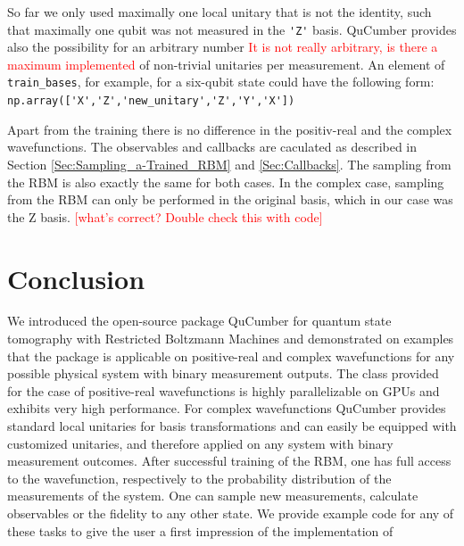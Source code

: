 \documentclass[submission, Phys]{SciPost}
\begin{document}
So far we only used maximally one local unitary that is not the identity, such that maximally one qubit was not measured in the \verb|'Z'| basis.
QuCumber provides also the possibility for an arbitrary number \textcolor{red}{It is not really arbitrary, is there a maximum implemented} of non-trivial unitaries per measurement.
An element of \verb|train_bases|, for example, for a six-qubit state could have the following form:
\verb|np.array(['X','Z','new_unitary','Z','Y','X'])|

Apart from the training there is no difference in the positiv-real and the complex wavefunctions. The observables and callbacks are caculated as described in Section \ref{Sec:Sampling_a-Trained_RBM} and \ref{Sec:Callbacks}.
The sampling from the RBM is also exactly the same for both cases.
In the complex case, sampling from the RBM can only be performed in the original basis, which in our case was the Z basis.
\textcolor{red}{[what's correct? Double check this with code]}
%

\section{Conclusion}

We introduced the open-source package QuCumber for quantum state tomography with Restricted Boltzmann Machines and demonstrated on examples that
the package is applicable on positive-real and complex wavefunctions for any possible physical system with binary measurement outputs.
The class provided for the case of positive-real wavefunctions is highly parallelizable on GPUs and exhibits very high performance.
For complex wavefunctions QuCumber provides standard local unitaries for basis transformations
and can easily be equipped with customized unitaries, and therefore applied on any system with binary measurement outcomes.
After successful training of the RBM, one has full access to the wavefunction, respectively to the probability distribution of the measurements of the system.
One can sample new measurements, calculate observables or the fidelity to any other state.
We provide example code for any of these tasks to give the user a first impression of the implementation of
\end{document}

